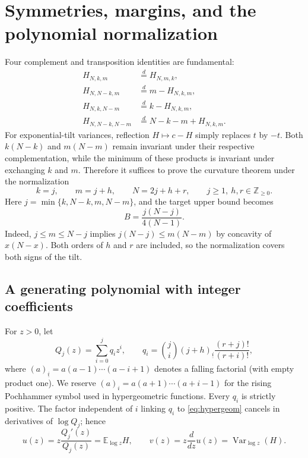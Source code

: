 \documentclass[11pt,a4paper]{article}
\DeclareMathOperator{\Var}{Var}\DeclareMathOperator{\Cov}{Cov}\DeclareMathOperator{\Hyp}{Hyp}\DeclareMathOperator{\Bern}{Bern}\DeclareMathOperator{\supp}{supp}\DeclareMathOperator{\artanh}{artanh}
\newcommand{\E}{\mathbb E}\newcommand{\R}{\mathbb R}\newcommand{\N}{\mathbb N}\newcommand{\one}{\mathbf1}
\begin{document}

\section{Symmetries, margins, and the polynomial normalization}\label{sec:reductions}
Four complement and transposition identities are fundamental:
\begin{align}
 H_{N,k,m}&\stackrel d=H_{N,m,k},\label{eq:sym1}\\
 H_{N,N-k,m}&\stackrel d=m-H_{N,k,m},\label{eq:sym2}\\
 H_{N,k,N-m}&\stackrel d=k-H_{N,k,m},\label{eq:sym3}\\
 H_{N,N-k,N-m}&\stackrel d=N-k-m+H_{N,k,m}.\label{eq:sym4}
\end{align}
For exponential-tilt variances, reflection $H\mapsto c-H$ simply replaces $t$ by $-t$. Both $k(N-k)$ and $m(N-m)$ remain invariant under their respective complementation, while the minimum of these products is invariant under exchanging $k$ and $m$. Therefore it suffices to prove the curvature theorem under the normalization
\begin{equation}\label{eq:param}
 k=j,\qquad m=j+h,\qquad N=2j+h+r,
 \qquad j\ge1,\ h,r\in\mathbb Z_{\ge0}.
\end{equation}
Here $j=\min\{k,N-k,m,N-m\}$, and the target upper bound becomes
\begin{equation}\label{eq:Bdef}
 B=\frac{j(N-j)}{4(N-1)}.
\end{equation}
Indeed, $j\le m\le N-j$ implies $j(N-j)\le m(N-m)$ by concavity of $x(N-x)$. Both orders of $h$ and $r$ are included, so the normalization covers both signs of the tilt.

\subsection{A generating polynomial with integer coefficients}
For $z>0$, let
\begin{equation}\label{eq:Q}
 Q_j(z)=\sum_{i=0}^j q_i z^i,
 \qquad
 q_i=\binom ji (j+h)_{\underline i}
 \frac{(r+j)!}{(r+i)!},
\end{equation}
where $(a)_{\underline i}=a(a-1)\cdots(a-i+1)$ denotes a falling factorial (with empty product one). We reserve $(a)_i=a(a+1)\cdots(a+i-1)$ for the rising Pochhammer symbol used in hypergeometric functions. Every $q_i$ is strictly positive. The factor independent of $i$ linking $q_i$ to \eqref{eq:hypergeom} cancels in derivatives of $\log Q_j$; hence
\begin{equation}\label{eq:tiltuv}
 u(z)=z\frac{Q_j'(z)}{Q_j(z)}=\E_{\log z}H,
 \qquad
 v(z)=z\frac{d}{dz}u(z)=\Var_{\log z}(H).
\end{equation}
\end{document}
